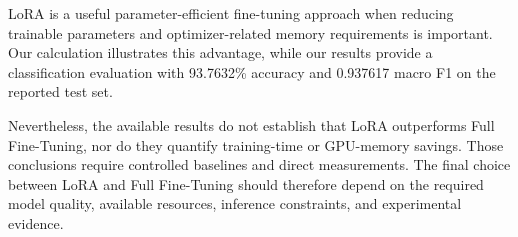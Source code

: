 LoRA is a useful parameter-efficient fine-tuning approach
when reducing trainable parameters and optimizer-related
memory requirements is important. Our calculation
illustrates this advantage, while our results provide
a classification evaluation with 93.7632\% accuracy and
0.937617 macro F1 on the reported test set.

Nevertheless, the available results do not establish that
LoRA outperforms Full Fine-Tuning, nor do they quantify
training-time or GPU-memory savings. Those conclusions
require controlled baselines and direct measurements.
The final choice between LoRA and Full Fine-Tuning should
therefore depend on the required model quality, available
resources, inference constraints, and experimental evidence.
